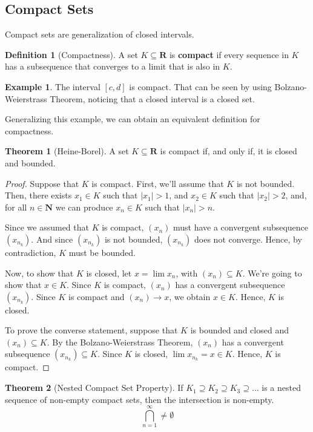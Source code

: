 \documentclass[tikz,12pt,a4paper]{article}
\theoremstyle{definition}
\newtheorem{theorem}{Theorem}[section]
\newtheorem{example}{Example}[section]
\newtheorem{definition}{Definition}[section]
\begin{document}
\subsection{Compact Sets}

Compact sets are generalization of closed intervals.

\begin{definition}[Compactness]
	A set $K \subseteq \textbf{R}$ is \textbf{compact} if every sequence in $K$ has a subsequence that converges to a limit that is also in $K$.
\end{definition}

\begin{example}
	The interval $[c,d]$ is compact. That can be seen by using Bolzano-Weierstrass Theorem, noticing that a closed interval is a closed set.
\end{example}

Generalizing this example, we can obtain an equivalent definition for compactness.

\begin{theorem}[Heine-Borel]\label{heine-borel}
	A set $K \subseteq \textbf{R}$ is compact if, and only if, it is closed and bounded.
\end{theorem}

\begin{proof}
	Suppose that $K$ is compact. First, we'll assume that $K$ is not bounded. Then, there exists $x_1 \in K$ such that $|x_1| > 1$, and $x_2 \in K$ such that $|x_2| > 2$, and, for all $n \in \textbf{N}$ we can produce $x_n \in K$ such that $|x_n| > n$.
	
	Since we assumed that $K$ is compact, $(x_n)$ must have a convergent subsequence $(x_{n_k})$. And since $(x_{n_k})$ is not bounded, $(x_{n_k})$ does not converge. Hence, by contradiction, $K$ must be bounded.
	
	Now, to show that $K$ is closed, let $x = \lim x_n$, with $(x_n) \subseteq K$. We're going to show that $x \in K$. Since $K$ is compact, $(x_n)$ has a convergent subsequence $(x_{n_k})$. Since $K$ is compact and $(x_n) \to x$, we obtain $x \in K$. Hence, $K$ is closed.
	
	To prove the converse statement, suppose that $K$ is bounded and closed and $(x_n) \subseteq K$. By the Bolzano-Weierstrass Theorem, $(x_n)$ has a convergent subsequence $(x_{n_k}) \subseteq K$. Since $K$ is closed, $\lim x_{n_k} = x \in K$. Hence, $K$ is compact.
\end{proof}

\begin{theorem}[Nested Compact Set Property]
	If $K_1 \supseteq K_2 \supseteq K_3 \supseteq \ldots$ is a nested sequence of non-empty compact sets, then the intersection is non-empty.
	\[
		\bigcap_{n=1}^\infty \neq \emptyset
	\]
\end{theorem}
\end{document}

